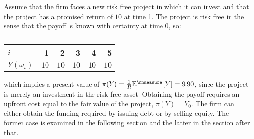 \documentclass[main.tex]{subfiles}
\begin{document}
    Assume that the firm faces a new risk free project in which it can invest
    and that the project has a promised return of $10$ at time 1.
    The project is risk free in the sense that the payoff is known with certainty at time 0, so:
        \begin{table}[H]
            \centering
            \begin{tabular}{l|rrrrr}
                $i$ & 1 & 2 & 3 & 4 & 5 \\
                \hline
                $Y(\omega_{i})$ & $10$ & $10$ & $10$ & $10$ & $10$
            \end{tabular}
            \caption{}
        \end{table}
    which implies a present value of $\pi(Y) = \discountfactor \mathbb{E}^{\rnmeasure}\left[Y\right] = 9.90$, 
    since the project is merely an investment in the risk free asset.
    Obtaining the payoff requires an upfront cost equal to the fair value of the project, $\pi(Y) = Y_{0}$.
    The firm can either obtain the funding required by issuing debt or by selling equity.
    The former case is examined in the following section and the latter in the section after that.
\end{document}
